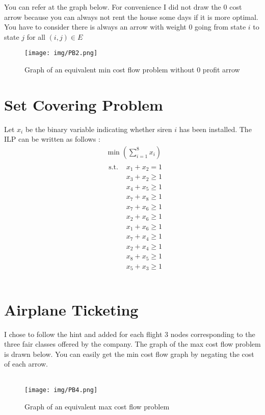 \documentclass{article}
\begin{document}
You can refer at the graph below. For convenience I did not draw the 0 cost arrow because you can always not rent the house some days if it is more optimal. You have to consider there is always an arrow with weight 0 going from state $i$ to state $j$ for all $(i,j)\in E$
\begin{figure}[H]
    \label{label:pb4}
    \texttt{[image: img/PB2.png]}
    \caption{Graph of an equivalent min cost flow problem without 0 profit arrow}
\end{figure}
\section*{Set Covering Problem}
Let $x_i$ be the binary variable indicating whether siren $i$ has been installed. The ILP can be written as follows : 
$$\boxed{\begin{split}
    &\min\left(\sum_{i=1}^8x_i\right)\\
    &\begin{split}
        \text{s.t. }& x_1+x_2 = 1\\
        &x_3+x_2 \ge 1\\
        &x_4+x_5 \ge 1\\
        &x_7+x_8 \ge 1\\
        &x_7+x_6 \ge 1\\
        &x_2+x_6 \ge 1\\
        &x_1+x_6 \ge 1\\
        &x_7+x_4 \ge 1\\        
        &x_2+x_4 \ge 1\\
        &x_8+x_5 \ge 1\\
        &x_5+x_3 \ge 1\\
    \end{split}\\
\end{split}}$$
\newpage
\section*{Airplane Ticketing}
I chose to follow the hint and added for each flight 3 nodes corresponding to the three fair classes offered by the company.
The graph of the max cost flow problem is drawn below. You can easily get the min cost flow graph by negating the cost of each arrow.\\\\
\begin{figure}[H]
    \label{label:pb4}
    \texttt{[image: img/PB4.png]}
    \caption{Graph of an equivalent max cost flow problem}
\end{figure}
\end{document}
